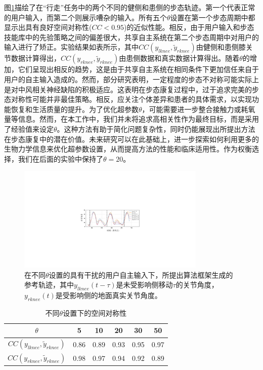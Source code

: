 图\ref{fig:5-5}描绘了在``行走''任务中的两个不同的健侧和患侧的步态轨迹。第一个代表正常的用户输入，而第二个则展示嘈杂的输入。所有五个$\theta$设置在第一个步态周期中都显示出具有良好空间对称性($CC<0.95$)的近似性能。相反，由于用户输入和步态技能库中的先验策略之间的偏差很大，共享自主系统在第二个步态周期中对用户的输入进行了矫正。实验结果如表\uppercase \expandafter{}所示，其中${CC}({y_{lknee}},{\tilde y_{rknee}})$由健侧和患侧膝关节数据计算得出，${CC}({y_{rknee}},{\tilde y_{rknee}})$由患侧数据和真实数据计算得出。随着$\theta $的增加，它们呈现出相反的趋势，这是由于共享自主系统在相同条件下更加信任来自于用户的自主输入造成的。然而，部分研究表明，一定程度的步态不对称可能实际上是对中风相关神经缺陷的积极适应。这表明在步态康复过程中，过于追求完美的步态对称性可能并非最佳策略。相反，应关注个体差异和患者的具体需求，以实现功能恢复和生活质量的提升\cite{balabanGaitDisturbancesPatients2014}。为了优化超参数$\theta $，可能需要进一步整合接触力或耗氧量等信息。然而，在本工作中，我们并未将追求高相关性作为最终目标，而是采用了经验值来设定$\theta $。这种方法有助于简化问题复杂性，同时仍能展现出所提出方法在步态康复中的潜在价值。未来研究可以在此基础上，进一步探索如何利用更多的生物力学信息来优化超参数设置，从而提高方法的性能和临床适用性。作为权衡选择，我们在后面的实验中保持了$\theta =20$。
\begin{figure}[!t]
  \centering\includegraphics[width=0.8\textwidth]{figures/5-Fig-5.pdf}
  \caption{在不同$\theta $设置的具有干扰的用户自主输入下，所提出算法框架生成的参考轨迹，其中${y_{lknee}}(t - \tau )$是未受影响侧移动$\tau $的关节角度，${y_{rknee}}(t)$是受影响侧的地面真实关节角度。}
  \label{fig:5-5}
\end{figure}

\begin{table}[!t]
  \centering
  \caption{不同$\theta $设置下的空间对称性}
  \begin{tabular}{cccccc}
  \toprule
          $\theta $         & 5 & 10 & 20 & 30 & 50  \\ 
  \midrule
          ${CC}({y_{lknee}},{\tilde y_{rknee}})$         & 0.86	&0.89	&0.93	&0.95	&0.97  \\ 
          ${CC}({y_{rknee}},{\tilde y_{rknee}})$         & 0.98 &0.97	&0.94	&0.92	&0.89  \\ 
  \bottomrule
  \end{tabular}
  \label{tab:5-1} 
\end{table}   

